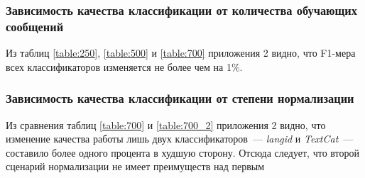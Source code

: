 \documentclass[a4paper, 14pt]{article}
\begin{document}
		\subsubsection{Зависимость качества классификации от количества обучающих сообщений}
		Из таблиц \ref{table:250}, \ref{table:500} и \ref{table:700} приложения 2 видно, что F1-мера всех классификаторов изменяется не более чем на 
		1\%. 
		
		\subsubsection{Зависимость качества классификации от степени нормализации}
		Из сравнения таблиц \ref{table:700} и \ref{table:700_2} приложения 2 видно, что изменение качества работы лишь двух классификаторов~--- \textit{langid} и \textit{TextCat}~--- составило более одного процента в худшую сторону. Отсюда следует, что второй сценарий нормализации не имеет преимуществ над первым
\end{document}
